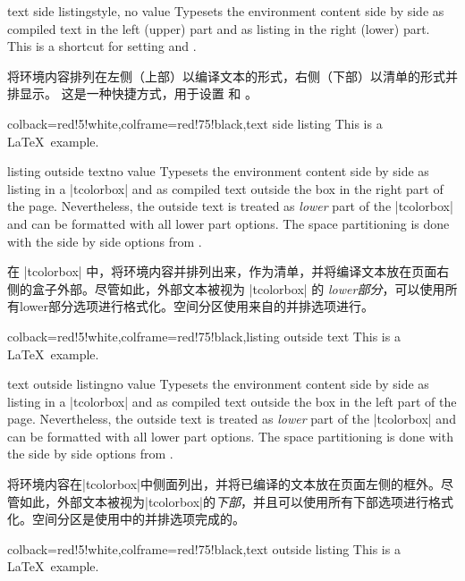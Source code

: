 \begin{docTcbKey}{text side listing}{}{style, no value}
Typesets the environment content side by side as compiled text in the left (upper)
part and as listing in the right (lower) part.
This is a shortcut for setting  and .

将环境内容排列在左侧（上部）以编译文本的形式，右侧（下部）以清单的形式并排显示。 这是一种快捷方式，用于设置  和 。
\begin{dispExample}
\begin{tcblisting}{colback=red!5!white,colframe=red!75!black,text side listing}
This is a \LaTeX\ example.
\end{tcblisting}
\end{dispExample}
\end{docTcbKey}


\begin{docTcbKey}{listing outside text}{}{no value}
Typesets the environment content side by side as listing in a |tcolorbox|
and as compiled text outside the box in the right part of the page.
Nevertheless, the outside text is treated as \emph{lower} part of the
|tcolorbox| and can be formatted with all lower part options.
The space partitioning is done with the side by side options from
.

在 |tcolorbox| 中，将环境内容并排列出来，作为清单，并将编译文本放在页面右侧的盒子外部。尽管如此，外部文本被视为 |tcolorbox| 的 \emph{lower部分}，可以使用所有lower部分选项进行格式化。空间分区使用来自的并排选项进行。
\begin{dispExample}
\begin{tcblisting}{colback=red!5!white,colframe=red!75!black,listing outside text}
This is a \LaTeX\ example.
\end{tcblisting}
\end{dispExample}
\end{docTcbKey}


\begin{docTcbKey}{text outside listing}{}{no value}
Typesets the environment content side by side as listing in a |tcolorbox|
and as compiled text outside the box in the left part of the page.
Nevertheless, the outside text is treated as \emph{lower} part of the
|tcolorbox| and can be formatted with all lower part options.
The space partitioning is done with the side by side options from
.

将环境内容在|tcolorbox|中侧面列出，并将已编译的文本放在页面左侧的框外。尽管如此，外部文本被视为|tcolorbox|的\emph{下部}，并且可以使用所有下部选项进行格式化。空间分区是使用中的并排选项完成的。
\begin{dispExample}
\begin{tcblisting}{colback=red!5!white,colframe=red!75!black,text outside listing}
This is a \LaTeX\ example.
\end{tcblisting}
\end{dispExample}
\end{docTcbKey}




